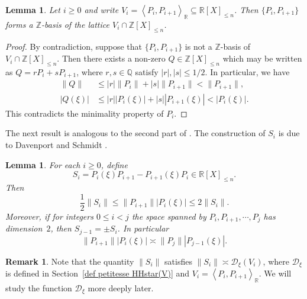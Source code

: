 \documentclass[JEP,XML,SOM,Unicode,NoFloatCountersInSection,published]{cedram}
\newcommand\bQ{\mathbb{Q}}
\newcommand\bR{\mathbb{R}}
\newcommand\bZ{\mathbb{Z}}
\newcommand\HHstar{\mathcal{D}_{\xi}}
\newcommand{\normH}[1]{\|#1\|}
\newcommand{\Vect}[2][]{\left\la #2\right\ra_{#1}}
\let\subset \subseteq
\let\la\langle
\let\ra\rangle
\theoremstyle{definition}
\newtheorem{Rem}[Def]{Remark}
\theoremstyle{plain}
\newtheorem{Lem}[Def]{Lemma}
\begin{document}
\begin{Lem}
\label{Lem: P_i, P_i+1 est une Z-base}
Let $i\geq 0$ and write $V_i = \Vect[\bR]{P_i,P_{i+1}} \subset \bR[X]_{\leq n}$. Then $\{P_i, P_{i+1}\}$ forms a $\bZ$-basis of the lattice $V_i\cap \bZ[X]_{\leq n}$.
\end{Lem}

\begin{proof}
By contradiction, suppose that $\{P_i, P_{i+1}\}$ is not a $\bZ$-basis of $V_i\cap \bZ[X]_{\leq n}$. Then there exists a non-zero $Q\in \bZ[X]_{\leq n}$ which may be written as $Q = rP_i + sP_{i+1}$, where $r,s\in\bQ$ satisfy $|r|,|s|\leq 1/2$. In particular, we have
\begin{align*}
\normH{Q} &\leq |r|\normH{P_i} + |s|\normH{P_{i+1}} < \normH{P_{i+1}}, \\
|Q(\xi)| &\leq |r||P_i(\xi)| + |s||P_{i+1}(\xi)| < |P_{i}(\xi)|.
\end{align*}
This contradicts the minimality property of $P_i$.
\end{proof}

The next result is analogous to the second part of \cite[Lem.\,4.1]{roy2004approximation}. The construction of $S_i$ is due to Davenport and Schmidt \cite{davenport1967approximation}.

\begin{Lem}
\label{Lem: P_iH_i+1 = P_j-1H_j}
For each $i\geq 0$, define
\[
S_i = P_i(\xi)P_{i+1} - P_{i+1}(\xi)P_i \in\bR[X]_{\leq n}.
\]
Then
\[
\frac{1}{2}\normH{S_i} \leq \normH{P_{i+1}}|P_i(\xi)| \leq 2\normH{S_i}.
\]
Moreover, if for integers $0\leq i < j$ the space spanned by $P_i, P_{i+1}, \cdots, P_{j}$ has dimension~$2$, then $S_{j-1} = \pm S_i$. In particular
\[
\normH{P_{i+1}}|P_i(\xi)| \asymp \normH{P_{j}}|P_{j-1}(\xi)|.
\]
\end{Lem}

\begin{Rem}
Note that the quantity $\normH{S_i}$ satisfies $\normH{S_i} \asymp \HHstar(V_i)$, where $\HHstar$ is defined in Section~\ref{def petitesse HHstar(V)} and $V_i=\Vect[\bR]{P_i,P_{i+1}}$. We will study the function $\HHstar$ more deeply later.
\end{Rem}
\end{document}
